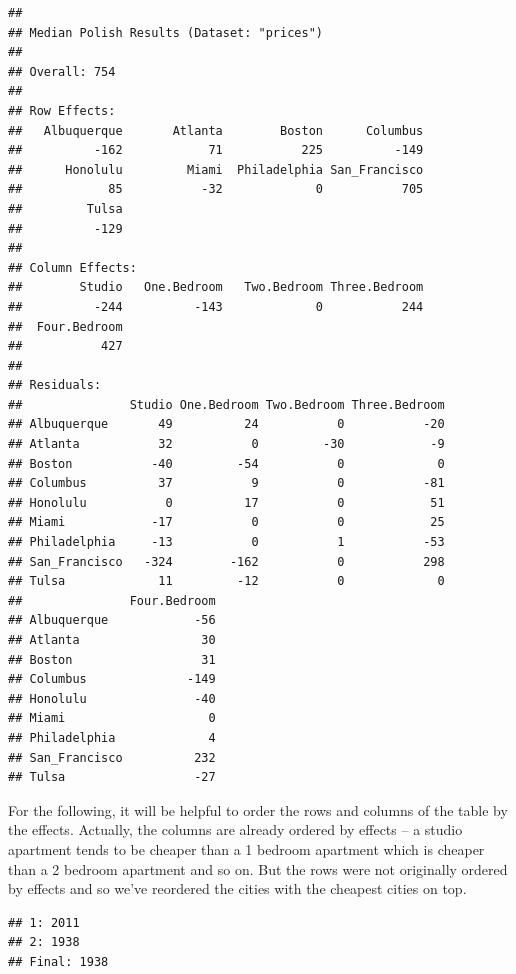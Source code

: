 \documentclass[
]{book}
\newenvironment{Shaded}{\begin{snugshade}}{\end{snugshade}}
\newcommand{\FunctionTok}[1]{\textcolor[rgb]{0.00,0.00,0.00}{#1}}
\newcommand{\NormalTok}[1]{#1}
\newcommand{\OtherTok}[1]{\textcolor[rgb]{0.56,0.35,0.01}{#1}}
\newcommand{\SpecialCharTok}[1]{\textcolor[rgb]{0.00,0.00,0.00}{#1}}
\begin{document}
\begin{verbatim}
## 
## Median Polish Results (Dataset: "prices")
## 
## Overall: 754
## 
## Row Effects:
##   Albuquerque       Atlanta        Boston      Columbus 
##          -162            71           225          -149 
##      Honolulu         Miami  Philadelphia San_Francisco 
##            85           -32             0           705 
##         Tulsa 
##          -129 
## 
## Column Effects:
##        Studio   One.Bedroom   Two.Bedroom Three.Bedroom 
##          -244          -143             0           244 
##  Four.Bedroom 
##           427 
## 
## Residuals:
##               Studio One.Bedroom Two.Bedroom Three.Bedroom
## Albuquerque       49          24           0           -20
## Atlanta           32           0         -30            -9
## Boston           -40         -54           0             0
## Columbus          37           9           0           -81
## Honolulu           0          17           0            51
## Miami            -17           0           0            25
## Philadelphia     -13           0           1           -53
## San_Francisco   -324        -162           0           298
## Tulsa             11         -12           0             0
##               Four.Bedroom
## Albuquerque            -56
## Atlanta                 30
## Boston                  31
## Columbus              -149
## Honolulu               -40
## Miami                    0
## Philadelphia             4
## San_Francisco          232
## Tulsa                  -27
\end{verbatim}

For the following, it will be helpful to order the rows and columns of the table by the effects. Actually, the columns are already ordered by effects -- a studio apartment tends to be cheaper than a 1 bedroom apartment which is cheaper than a 2 bedroom apartment and so on. But the rows were not originally ordered by effects and so we've reordered the cities with the cheapest cities on top.

\begin{Shaded}
\end{Shaded}

\begin{verbatim}
## 1: 2011
## 2: 1938
## Final: 1938
\end{verbatim}
\end{document}
